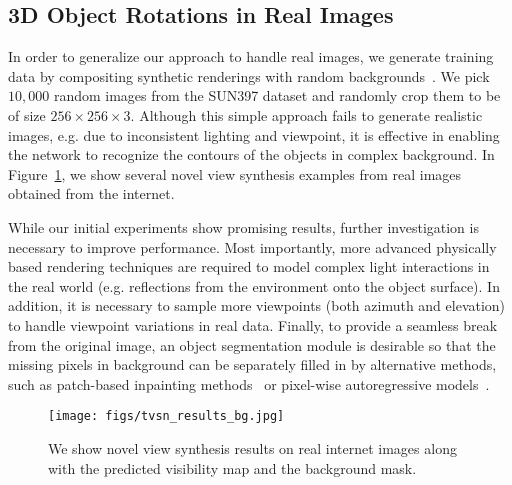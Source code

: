 \documentclass[10pt,twocolumn,letterpaper]{article}
\begin{document}
%
\subsection{3D Object Rotations in Real Images}
%
In order to generalize our approach to handle real images, we generate training data by compositing synthetic renderings with random backgrounds~\cite{Su_iccv2015}. We pick $10,000$ random images from the SUN397 dataset\cite{Su_iccv2015} and randomly crop them to be of size $256\!\times\!256\!\times\!3$. Although this simple approach fails to generate realistic images, e.g. due to inconsistent lighting and viewpoint, it is effective in enabling the network to recognize the contours of the objects in complex background. In Figure~\ref{fig:tvsn_results_bg}, we show several novel view synthesis examples from real images obtained from the internet. 

While our initial experiments show promising results, further investigation is necessary to improve performance. Most importantly, more advanced physically based rendering techniques are required to model complex light interactions in the real world (e.g. reflections from the environment onto the object surface). In addition, it is necessary to sample more viewpoints (both azimuth and elevation) to handle viewpoint variations in real data. 
Finally, to provide a seamless break from the original image, an object segmentation module is desirable so that the missing pixels in background can be separately filled in by alternative methods, such as patch-based inpainting methods~\cite{barnes_siggraph2009} or pixel-wise autoregressive models~\cite{van2016pixel}.

\begin{figure}[t]
\vspace{-2mm}
\begin{center}
\texttt{[image: figs/tvsn\_results\_bg.jpg]}
\end{center}
\caption{We show novel view synthesis results on real internet images along with the predicted visibility map and the background mask.}
\label{fig:tvsn_results_bg}
\vspace{-2mm}
\end{figure}
\end{document}
